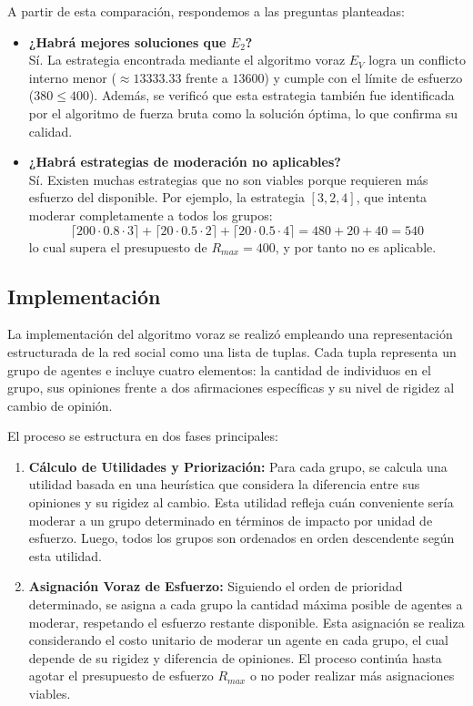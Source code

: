 \documentclass[11pt,letter]{article}
\begin{document}
A partir de esta comparación, respondemos a las preguntas planteadas:

\begin{itemize}
    \item \textbf{¿Habrá mejores soluciones que $E_2$?} \\
    Sí. La estrategia encontrada mediante el algoritmo voraz $E_V$ logra un conflicto interno menor ($\approx 13333.33$ frente a $13600$) y cumple con el límite de esfuerzo ($380 \leq 400$). Además, se verificó que esta estrategia también fue identificada por el algoritmo de fuerza bruta como la solución óptima, lo que confirma su calidad.

    \item \textbf{¿Habrá estrategias de moderación no aplicables?} \\
    Sí. Existen muchas estrategias que no son viables porque requieren más esfuerzo del disponible. Por ejemplo, la estrategia $[3, 2, 4]$, que intenta moderar completamente a todos los grupos:
    \[
    \lceil 200 \cdot 0.8 \cdot 3 \rceil + \lceil 20 \cdot 0.5 \cdot 2 \rceil + \lceil 20 \cdot 0.5 \cdot 4 \rceil = 480 + 20 + 40 = 540
    \]
    lo cual supera el presupuesto de $R_{max} = 400$, y por tanto no es aplicable.
\end{itemize}


\subsection{Implementación}

La implementación del algoritmo voraz se realizó empleando una representación estructurada de la red social como una lista de tuplas. Cada tupla representa un grupo de agentes e incluye cuatro elementos: la cantidad de individuos en el grupo, sus opiniones frente a dos afirmaciones específicas y su nivel de rigidez al cambio de opinión.

El proceso se estructura en dos fases principales:

\begin{enumerate}
    \item \textbf{Cálculo de Utilidades y Priorización:} Para cada grupo, se calcula una utilidad basada en una heurística que considera la diferencia entre sus opiniones y su rigidez al cambio. Esta utilidad refleja cuán conveniente sería moderar a un grupo determinado en términos de impacto por unidad de esfuerzo. Luego, todos los grupos son ordenados en orden descendente según esta utilidad.

    \item \textbf{Asignación Voraz de Esfuerzo:} Siguiendo el orden de prioridad determinado, se asigna a cada grupo la cantidad máxima posible de agentes a moderar, respetando el esfuerzo restante disponible. Esta asignación se realiza considerando el costo unitario de moderar un agente en cada grupo, el cual depende de su rigidez y diferencia de opiniones. El proceso continúa hasta agotar el presupuesto de esfuerzo $R_{max}$ o no poder realizar más asignaciones viables.
\end{enumerate}
\end{document}
